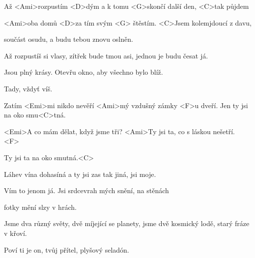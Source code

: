 

\zs
Až <Ami>rozpustím <D>dým a k tomu
<G>skončí další den, <C>tak půjdem

<Ami>oba domů <D>za tím svým <G>
štěstím. <C>Jsem kolemjdoucí z davu,

součást osudu, a budu
tebou znovu oslněn.
\ks

\zs
Až rozpustíš si vlasy, zítřek bude tmou
asi, jednou je budu česat já.

Jsou plný krásy. Otevřu okno,
aby všechno bylo blíž.

Tady, vždyť víš.
\ks


\zr \kr

\zs
Zatím <Emi>mi nikdo nevěří <Ami>mý vzdušný zámky
<F>u dveří. Jen ty jsi na oko smu<C>tná.

<Emi>A co mám dělat, když jsme tři? <Ami>Ty jsi ta, co s láskou 
nešetří. <F>

Ty jsi ta na oko smutná.<C>
\ks

\zs
Láhev vína dohasíná a ty jsi
zas tak jiná, jsi moje.

Vím to jenom já. Jsi srdcevrah
mých snění, na stěnách

fotky mění slzy v hrách.

\ks

\zr \kr

\zs
Jsme dva různý světy, dvě míjející se planety,
jsme dvě kosmický lodě, starý fráze v křoví.

Poví ti je on, tvůj přítel,
plyšový seladón.
\ks


\zr \kr

\kp





